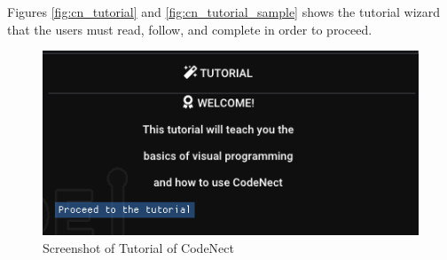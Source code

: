 \parx
Figures \ref{fig:cn_tutorial} and \ref{fig:cn_tutorial_sample} shows the tutorial wizard
that the users must read, follow, and complete in order to proceed.

\begin{figure}[H]
	\centering
	\captionsetup{justification=centering}
	\captionsetup[figure]{list=yes}
	\includegraphics[width=\linewidth]{media/sc_tutorial.png}
	\caption[Screenshot of Tutorial of CodeNect]{Screenshot of Tutorial of CodeNect}
	\label{fig:cn_tutoria}
\end{figure}

